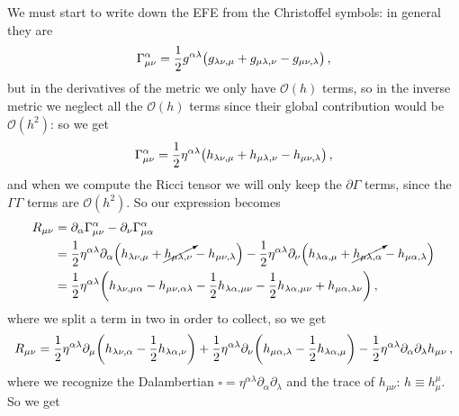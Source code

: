 \documentclass[main.tex]{subfiles}
\begin{document}
We must start to write down the EFE from the Christoffel symbols: in general they are 
%
\begin{align}
\Gamma^{\alpha }_{\mu \nu } = \frac{1}{2} g^{\alpha \lambda } \qty(g_{\lambda \nu , \mu } + g_{\mu \lambda , \nu } - g_{\mu \nu , \lambda })
\,,
\end{align}
%
but in the derivatives of the metric we only have \(\mathcal{O}(h)\) terms, so in the inverse metric we neglect all the \(\mathcal{O}(h)\) terms since their global contribution would be \(\mathcal{O}(h^2)\): so we get 
%
\begin{align}
    \Gamma^{\alpha }_{\mu \nu } = \frac{1}{2} \eta ^{\alpha \lambda } \qty(h_{\lambda \nu , \mu } + h_{\mu \lambda , \nu } - h_{\mu \nu , \lambda })
\,,
\end{align}
%
and when we compute the Ricci tensor we will only keep the \(\partial \Gamma \) terms, since the \(\Gamma \Gamma \) terms are \(\mathcal{O}(h^2)\). So our expression becomes 
%
\begin{subequations}
\begin{align}
R_{\mu \nu } &= \partial_{\alpha } \Gamma^{\alpha }_{\mu \nu } - \partial_{\nu } \Gamma^{\alpha }_{\mu \alpha }  \\
&= \frac{1}{2} \eta^{\alpha \lambda } \partial_{\alpha } \qty(h_{\lambda \nu , \mu } + \cancelto{}{h_{\mu \lambda , \nu }} - h_{\mu \nu , \lambda }) - \frac{1}{2} \eta^{\alpha \lambda } \partial_{\nu  }\qty(h_{\lambda \alpha , \mu } + \cancelto{}{h_{\mu \lambda , \alpha }} - h_{\mu \alpha , \lambda })  \\
&= \frac{1}{2} \eta^{\alpha \lambda } \qty(h_{\lambda \nu , \mu \alpha } - h_{\mu \nu , \alpha \lambda } - \frac{1}{2} h_{\lambda \alpha , \mu \nu } - \frac{1}{2} h_{\lambda \alpha , \mu \nu } + h_{\mu \alpha , \lambda \nu } )
\,,
\end{align}
\end{subequations}
%
where we split a term in two in order to collect, so we get 
%
\begin{align}
R_{\mu \nu } = \frac{1}{2} \eta^{\alpha \lambda } \partial_{\mu } \qty(h_{\lambda \nu , \alpha } - \frac{1}{2} h_{\lambda \alpha , \nu })
+ \frac{1}{2} \eta^{\alpha \lambda } \partial_{\nu } 
\qty(h_{\mu \alpha , \lambda } - \frac{1}{2} h_{\lambda \alpha , \mu })- \frac{1}{2} \eta^{\alpha \lambda } \partial_{\alpha } \partial_{\lambda } h_{\mu \nu }
\,,
\end{align}
%
where we recognize the Dalambertian \(\square = \eta^{\alpha \lambda  }  \partial_{\alpha } \partial_{\lambda }\) and the trace of \(h_{\mu \nu }\): \(h \equiv h^{\mu }_{\mu }\). So we get 
\end{document}
